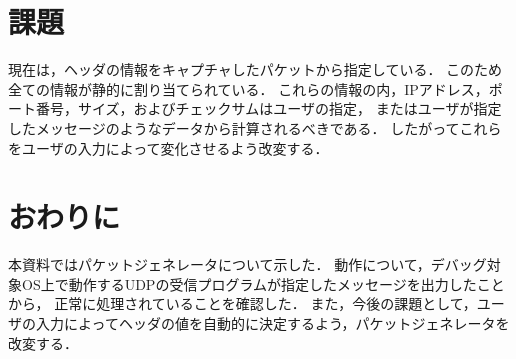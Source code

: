 \documentclass[12pt]{jsarticle}
\begin{document}
\section{課題}
現在は，ヘッダの情報をキャプチャしたパケットから指定している．
このため全ての情報が静的に割り当てられている．
これらの情報の内，IPアドレス，ポート番号，サイズ，およびチェックサムはユーザの指定，
またはユーザが指定したメッセージのようなデータから計算されるべきである．
したがってこれらをユーザの入力によって変化させるよう改変する．
\section{おわりに}
本資料ではパケットジェネレータについて示した．
動作について，デバッグ対象OS上で動作するUDPの受信プログラムが指定したメッセージを出力したことから，
正常に処理されていることを確認した．
また，今後の課題として，ユーザの入力によってヘッダの値を自動的に決定するよう，パケットジェネレータを
改変する．
\end{document}
